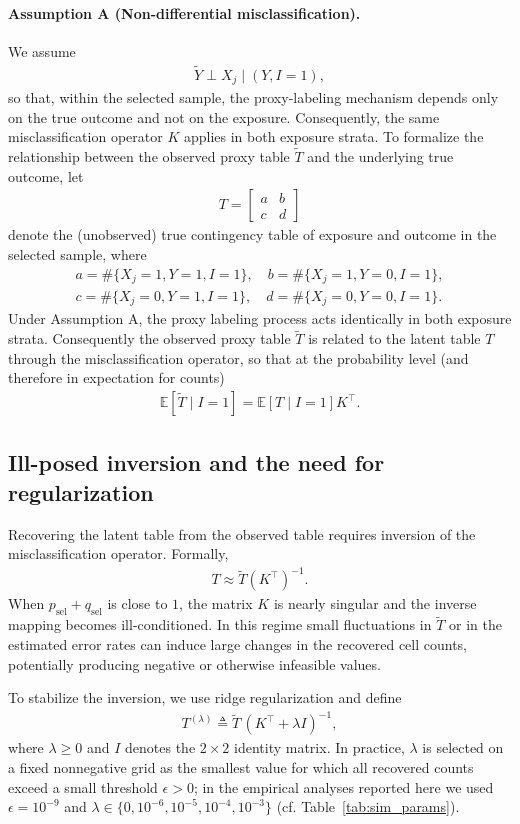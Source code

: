 \documentclass[pdflatex,sn-mathphys-num]{sn-jnl}%
\def\EQSP{3pt}
\newcommand{\cgather}[2][\EQSP]{\begingroup\setlength\abovedisplayskip{#1}\setlength\belowdisplayskip{#1}\begin{gather} #2 \end{gather}\endgroup\noindent}
\theoremstyle{thmstyleone}%
\theoremstyle{thmstyletwo}%
\theoremstyle{thmstylethree}%
\begin{document}
\paragraph{Assumption A (Non-differential misclassification).}
We assume
\cgather{
\tilde Y \perp X_j \mid (Y,I=1),
}
so that, within the selected sample, the proxy-labeling mechanism depends only on the true outcome and not on the exposure. Consequently, the same misclassification operator $K$ applies in both exposure strata. To formalize the relationship between the observed proxy table $\tilde T$ and the underlying true outcome, let
\cgather{
T=
\begin{bmatrix}
a & b\\
c & d
\end{bmatrix}
}
denote the (unobserved) true contingency table of exposure and outcome in the selected sample, where
\cgather{
a=\#\{X_j=1,Y=1,I=1\},\quad
b=\#\{X_j=1,Y=0,I=1\},\\
c=\#\{X_j=0,Y=1,I=1\},\quad
d=\#\{X_j=0,Y=0,I=1\}.
}
Under Assumption A, the proxy labeling process acts identically in both exposure strata. Consequently the observed proxy table $\tilde T$ is related to the latent table $T$ through the misclassification operator, so that at the probability level (and therefore in expectation for counts)
\cgather{
\mathbb{E}[\tilde T\mid I=1]
=
\mathbb{E}[T\mid I=1]K^\top.
}

\subsection{Ill-posed inversion and the need for regularization}
Recovering the latent table from the observed table requires inversion of the misclassification operator. Formally,
\cgather{
T \approx \tilde T (K^\top)^{-1}. \label{inversioneq}
}%
When $p_{\mathrm{sel}}+q_{\mathrm{sel}}$ is close to $1$, the matrix $K$ is nearly singular and the inverse mapping becomes ill-conditioned. In this regime small fluctuations in $\tilde T$ or in the estimated error rates can induce large changes in the recovered cell counts, potentially producing negative or otherwise infeasible values.

To stabilize the inversion, we use ridge regularization and define
\cgather{
T^{(\lambda)} \triangleq \tilde T\,(K^\top+\lambda I)^{-1},
\label{eq:spor_corrected_table}
}
where $\lambda\ge0$ and $I$ denotes the $2\times2$ identity matrix. In practice, $\lambda$ is selected on a fixed nonnegative grid as the smallest value for which all recovered counts exceed a small threshold $\epsilon>0$; in the empirical analyses reported here we used $\epsilon=10^{-9}$ and $\lambda\in\{0,10^{-6},10^{-5},10^{-4},10^{-3}\}$ (cf. Table~\ref{tab:sim_params}).
\end{document}
